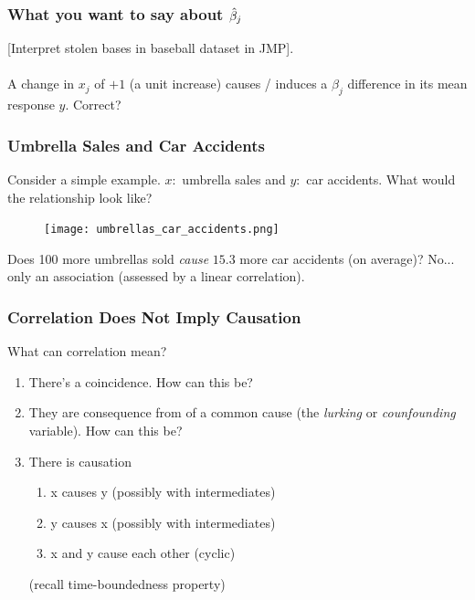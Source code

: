 \documentclass[handout]{beamer}
\begin{document}
\begin{frame}\frametitle{What you want to say about $\hat{\beta}_j$}

[Interpret stolen bases in baseball dataset in JMP].\\~\\

A change in $x_j$ of $+1$ (a unit increase) causes / induces a $\beta_j$ difference in its mean response $y$. Correct?

\end{frame}


\begin{frame}\frametitle{Umbrella Sales and Car Accidents}

Consider a simple example. $x:$ umbrella sales and $y:$ car accidents. What would the relationship look like? \pause

\begin{figure}
\centering
\texttt{[image: umbrellas\_car\_accidents.png]}
\end{figure}

Does 100 more umbrellas sold \textit{cause} $15.3$ more car accidents (on average)? \pause No... only an association (assessed by a linear correlation).

\end{frame}

\begin{frame}\frametitle{Correlation Does Not Imply Causation}

What can correlation mean?

\begin{enumerate}
\item There's a coincidence. How can this be?
\item They are consequence from of a common cause (the \emph{lurking} or \emph{counfounding} variable). How can this be?
\item There is causation \pause
\begin{enumerate}
\item x causes y (possibly with intermediates)
\item y causes x (possibly with intermediates)
\item x and y cause each other (cyclic)
\end{enumerate}
(recall time-boundedness property)
\end{enumerate}

\end{frame}
\end{document}
